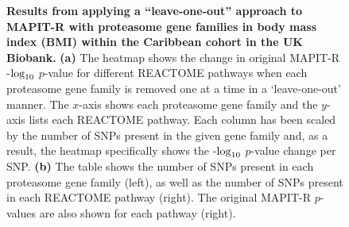 \documentclass[10pt]{article}
\def\log{{\rm log}}
\begin{document}
\begin{figure}[H]
{\begin{tabular}{|cc|ccc|}
  \hline
\end{tabular}}
\caption{\textbf{Results from applying a ``leave-one-out'' approach to MAPIT-R with proteasome gene families in body mass index (BMI) within the Caribbean cohort in the UK Biobank.} \textbf{(a)} The heatmap shows the change in original MAPIT-R -$\log_{10}$ $p$-value for different REACTOME pathways when each proteasome gene family is removed one at a time in a `leave-one-out' manner. The $x$-axis shows each proteasome gene family and the $y$-axis lists each REACTOME pathway. Each column has been scaled by the number of SNPs present in the given gene family and, as a result, the heatmap specifically shows the -$\log_{10}$ $p$-value change per SNP. \textbf{(b)} The table shows the number of SNPs present in each proteasome gene family (left), as well as the number of SNPs present in each REACTOME pathway (right). The original MAPIT-R $p$-values are also shown for each pathway (right).}
\label{InterPath-Supp-Figure-Prot-Heatplots-Caribbean}
\end{figure}
\clearpage

\end{document}

